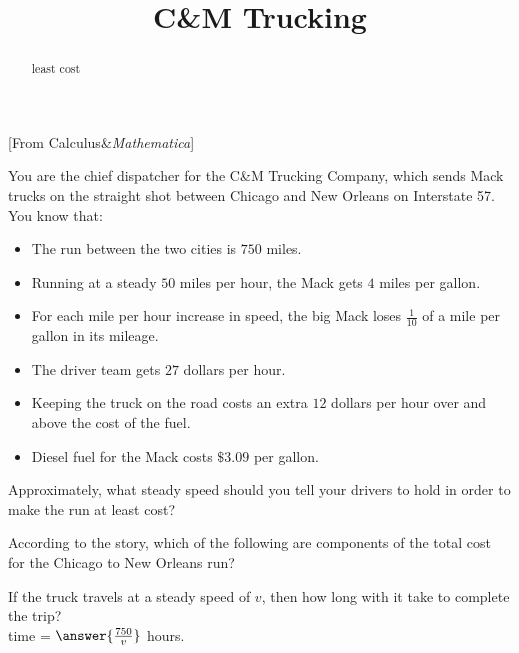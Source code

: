 \documentclass{ximera}
\title{C{\&}M Trucking}
\begin{document}
\begin{abstract}
least cost
\end{abstract}
\maketitle


[From Calculus\&\textit{Mathematica}]




You are the chief dispatcher for the C{\&}M Trucking Company, which sends Mack trucks on the straight shot between Chicago and New Orleans on Interstate 57.  You know that:



\begin{itemize}
\item The run between the two cities is $750$ miles.
\item Running at a steady $50$ miles per hour, the Mack gets $4$ miles per gallon.
\item For each mile per hour increase in speed, the big Mack loses $\frac{1}{10}$ of a mile per gallon in its mileage.
\item The driver team gets $27$ dollars per hour.
\item Keeping the truck on the road costs an extra $12$ dollars per hour over and above the cost of the fuel.
\item Diesel fuel for the Mack costs $\$3.09$ per gallon. 
\end{itemize}

Approximately, what steady speed should you tell your drivers to hold in order to make the run at least cost? \\





\begin{question} 


According to the story, which of the following are components of the total cost for the Chicago to New Orleans run?

\begin{selectAll}
\end{selectAll}
\end{question}


\begin{question} 


If the truck travels at a steady speed of $v$, then how long with it take to complete the trip? \\

time = $\answer{\frac{750}{v}}$ hours.
\end{question}
\end{document}
